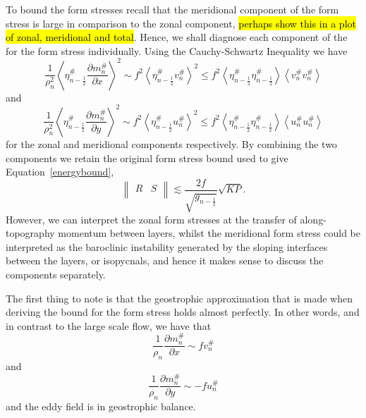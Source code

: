 \documentclass[12pt,a4paper]{report}
\newcommand*\nthkmean[1]{\left\langle{#1}\right\rangle}
\newcommand*\nthkres[1]{{#1}^{\#}}
\newcommand*\equref[1]{Equation~\eqref{#1}}
\newcommand*{\half}{\frac{1}{2}}
\newcommand*{\partialdiff}[2][{}]{\frac{\partial #1}{\partial #2}}
\begin{document}
To bound the form stresses recall that the meridional component of the
form stress is large in comparison to the zonal component, \hl{perhaps show this in 
	a plot of zonal, meridional and total}. Hence, we shall diagnose each component of the
for the form stress individually. Using the Cauchy-Schwartz Inequality we have
\begin{equation}
\frac{1}{\rho_{n}^{2}}\nthkmean{\nthkres{\eta}_{n-\half}\partialdiff[\nthkres{m}_n]{x}}^{2}
\sim{f^{2}}\nthkmean{\nthkres{\eta}_{n-\half}\nthkres{v}_n}^{2}
\leq{f^{2}}\nthkmean{\nthkres{\eta}_{n-\half}\nthkres{\eta}_{n-\half}}\nthkmean{\nthkres{v}_n\nthkres{v}_n}
\end{equation}
and 
\begin{equation}
\frac{1}{\rho_{n}^{2}}\nthkmean{\nthkres{\eta}_{n-\half}\partialdiff[\nthkres{m}_n]{y}}^{2}
\sim{f^{2}}\nthkmean{\nthkres{\eta}_{n-\half}\nthkres{u}_n}^{2}
\leq{f^{2}}\nthkmean{\nthkres{\eta}_{n-\half}\nthkres{\eta}_{n-\half}}\nthkmean{\nthkres{u}_n\nthkres{u}_n}
\end{equation}
for the zonal and meridional components respectively. 
By combining the two components we retain the original form stress bound used to give
\equref{energybound},
\begin{equation}\left\|
\begin{array}{cc}
R & S\\
\end{array}
\right\| \lesssim \frac{2 f}{\sqrt{g_{n-\half}}} \sqrt{KP}.
\end{equation}
However, we can interpret the zonal form stresses at the transfer of along-topography
momentum between layers, whilst the meridional form stress could be interpreted as the
baroclinic instability generated by the sloping interfaces between the layers, or isopycnals, and hence it makes sense to discuss the components separately. 

The first thing to note is that the geostrophic approximation that is made when
deriving the bound for the form stress holds almost perfectly. In other words, and
in contrast to the large scale flow, we have that 
\begin{equation}
\frac{1}{\rho_{n}}\partialdiff[\nthkres{m}_n]{x}
\sim{f}\nthkres{v}_n
\end{equation}
and 
\begin{equation}
\frac{1}{\rho_{n}}\partialdiff[\nthkres{m}_n]{y}
\sim-{f}\nthkres{u}_n
\end{equation} 
and the eddy field is in geostrophic balance. 
\end{document}
